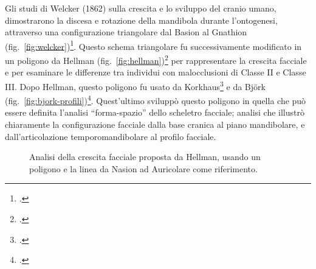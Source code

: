 Gli studi di Welcker (1862) sulla crescita e lo sviluppo del cranio umano, dimostrarono la discesa e rotazione della mandibola durante l'ontogenesi, attraverso una configurazione triangolare dal Basion al Gnathion (fig.~\vref{fig:welcker})\footcite{Welcker1866}. Questo schema triangolare fu successivamente modificato in un poligono da Hellman (fig.~\vref{fig:hellman})\footcite{Hellman1935} per rappresentare la crescita facciale e per esaminare le differenze tra individui con malocclusioni di Classe II e Classe III. Dopo Hellman, questo poligono fu usato da Korkhaus\footcite{Korkhaus1939} e da Björk (fig.~\vref{fig:bjork-profili})\footcite{Bjoerk1947}. Quest'ultimo sviluppò questo poligono in quella che può essere definita l'analisi ``forma-spazio'' dello scheletro facciale; analisi che illustrò chiaramente la configurazione facciale dalla base cranica al piano mandibolare, e dall'articolazione temporomandibolare al profilo facciale.

\begin{figure}
\centering
{}
\caption{Analisi della crescita facciale proposta da Hellman, usando un poligono e la linea da Nasion ad Auricolare come riferimento.}
\label{fig:hellman}
\end{figure}

